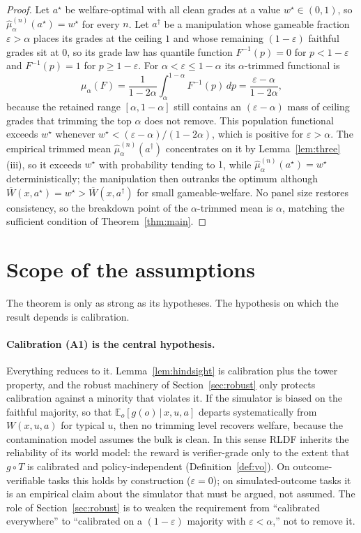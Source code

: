 \documentclass[11pt]{article}
\theoremstyle{plain}
\theoremstyle{definition}
\theoremstyle{remark}
\newcommand{\E}{\mathbb{E}}
\newcommand{\Wbar}{\overline{W}}
\newcommand{\given}{\,\vert\,}
\newcommand{\eps}{\varepsilon}
\begin{document}
\begin{proof}
Let $a^\star$ be welfare-optimal with all clean grades at a value $w^\star\in(0,1)$, so
$\hat\mu_\alpha^{(n)}(a^\star)=w^\star$ for every $n$. Let $a^\dagger$ be a manipulation whose
gameable fraction $\eps>\alpha$ places its grades at the ceiling $1$ and whose remaining
$(1-\eps)$ faithful grades sit at $0$, so its grade law has quantile function $F^{-1}(p)=0$ for
$p<1-\eps$ and $F^{-1}(p)=1$ for $p\ge1-\eps$. For $\alpha<\eps\le1-\alpha$ its $\alpha$-trimmed
functional is
\[
  \mu_\alpha(F)=\frac{1}{1-2\alpha}\int_\alpha^{1-\alpha}F^{-1}(p)\,dp=\frac{\eps-\alpha}{1-2\alpha},
\]
because the retained range $[\alpha,1-\alpha]$ still contains an $(\eps-\alpha)$ mass of ceiling
grades that trimming the top $\alpha$ does not remove. This population functional exceeds $w^\star$
whenever $w^\star<(\eps-\alpha)/(1-2\alpha)$, which is positive for $\eps>\alpha$. The empirical
trimmed mean $\hat\mu_\alpha^{(n)}(a^\dagger)$ concentrates on it by Lemma~\ref{lem:three}(iii), so
it exceeds $w^\star$ with probability tending to $1$, while $\hat\mu_\alpha^{(n)}(a^\star)=w^\star$
deterministically; the manipulation then outranks the optimum although
$\Wbar(x,a^\star)=w^\star>\Wbar(x,a^\dagger)$ for small gameable-welfare. No panel size restores
consistency, so the breakdown point of the $\alpha$-trimmed mean is $\alpha$, matching the
sufficient condition of Theorem~\ref{thm:main}.
\end{proof}


\section{Scope of the assumptions}
\label{sec:discussion}

The theorem is only as strong as its hypotheses. The hypothesis on which the result depends is
calibration.

\paragraph{Calibration (A1) is the central hypothesis.}
Everything reduces to it. Lemma~\ref{lem:hindsight} is calibration plus the tower property, and
the robust machinery of Section~\ref{sec:robust} only protects calibration against a minority
that violates it. If the simulator is biased on the faithful majority, so that
$\E_o[g(o)\given x,u,a]$ departs systematically from $W(x,u,a)$ for typical $u$, then no trimming
level recovers welfare, because the contamination model assumes the bulk is clean. In this sense
RLDF inherits the reliability of its world model: the reward is verifier-grade only to the extent
that $g\circ T$ is calibrated and policy-independent (Definition~\ref{def:vo}). On
outcome-verifiable tasks this holds by construction ($\eps=0$); on simulated-outcome tasks it is
an empirical claim about the simulator that must be argued, not assumed. The role of
Section~\ref{sec:robust} is to weaken the requirement from ``calibrated everywhere'' to
``calibrated on a $(1-\eps)$ majority with $\eps<\alpha$,'' not to remove it.
\end{document}
